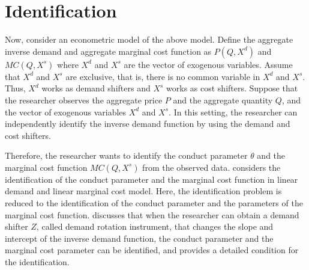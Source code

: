 \documentclass[11pt, a4paper]{article}
\theoremstyle{remark}
\begin{document}
\section{Identification}
Now, consider an econometric model of the above model.
Define the aggregate inverse demand and aggregate marginal cost function as $P(Q, X^{d})$ and $MC(Q, X^{s})$ where $X^{d}$ and $X^{s}$ are the vector of exogenous variables.
Assume that $X^{d}$ and $X^{s}$ are exclusive, that is, there is no common variable in $X^{d}$ and $X^{s}$.
Thus, $X^{d}$ works as demand shifters and $X^{s}$ works as cost shifters. 
Suppose that the researcher observes the aggregate price $P$ and the aggregate quantity $Q$, and the vector of exogenous variables $X^{d}$ and $X^{s}$.
In this setting, the researcher can independently identify the inverse demand function by using the demand and cost shifters.

Therefore, the researcher wants to identify the conduct parameter $\theta$ and the marginal cost function $MC(Q, X^{s})$ from the observed data.
\cite{bresnahan1982oligopoly} considers the identification of the conduct parameter and the marginal cost function in linear demand and linear marginal cost model.
Here, the identification problem is reduced to the identification of the conduct parameter and the parameters of the marginal cost function.
\citet{bresnahan1982oligopoly} discusses that when the researcher can obtain a demand shifter $Z$, called demand rotation instrument, that changes the slope and intercept of the inverse demand function, the conduct parameter and the marginal cost parameter can be identified, and \citet{matsumura2023resolving} provides a detailed condition for the identification.
\end{document}
